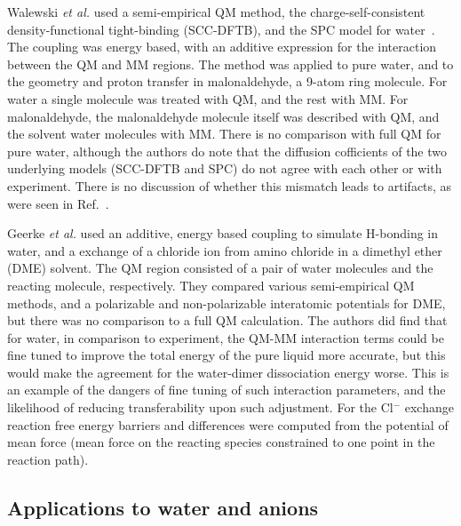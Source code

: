 \documentclass[11pt]{revtex4}
\begin{document}
Walewski {\it et al.} used a semi-empirical QM method, the
charge-self-consistent density-functional tight-binding (SCC-DFTB),
and the SPC model for water~\cite{walewski_chem_phys_lett_2004a}.
The coupling was energy based, with an additive expression for the
interaction between the QM and MM regions.  The method was applied
to pure water, and to the geometry and proton transfer in malonaldehyde,
a 9-atom ring molecule.  For water a single molecule was treated
with QM, and the rest with MM.  For malonaldehyde, the malonaldehyde
molecule itself was described with QM, and the solvent water molecules
with MM.  There is no comparison with full QM for pure water,
although the authors do note that the diffusion cofficients of the
two underlying models (SCC-DFTB and SPC) do not agree with each
other or with experiment.  There is no discussion of whether this
mismatch leads to artifacts, as were seen in
Ref.~.

Geerke {\it et al.} used an additive, energy based coupling to
simulate H-bonding in water, and a exchange of a chloride ion from
amino chloride in a dimethyl ether (DME) solvent.  The QM region
consisted of a pair of water molecules and the reacting molecule,
respectively.  They compared various semi-empirical QM methods, and
a polarizable and non-polarizable interatomic potentials for DME,
but there was no comparison to a full QM calculation.  The authors
did find that for water, in comparison to experiment, the QM-MM
interaction terms could be fine tuned to improve the total energy
of the pure liquid more accurate, but this would make the agreement
for the water-dimer dissociation energy worse.  This is an example
of the dangers of fine tuning of such interaction parameters, and
the likelihood of reducing transferability upon such adjustment.
For the Cl$^-$ exchange reaction free energy barriers and differences
were computed from the potential of mean force (mean force on the
reacting species constrained to one point in the reaction path).

\subsection{Applications to water and anions}
\end{document}
